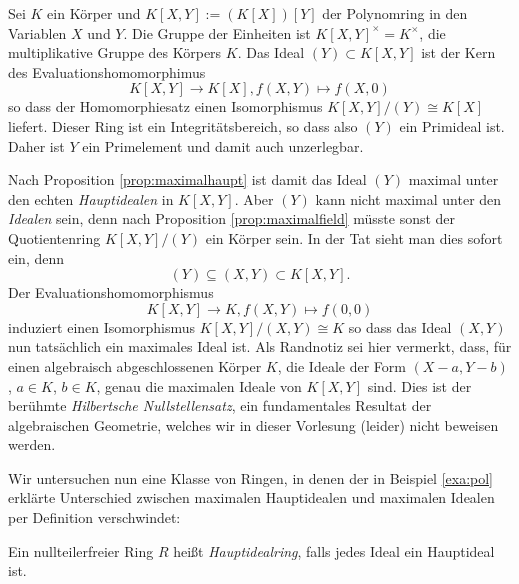 \documentclass{book}
\begin{document}
\begin{exa}
    \label{exa:pol}
    Sei $K$ ein Körper und $K[X,Y] := (K[X])[Y]$ der Polynomring in den Variablen $X$ und
    $Y$. Die Gruppe der Einheiten ist $K[X,Y]^{\times} = K^{\times}$, die
    multiplikative Gruppe des Körpers $K$. Das Ideal $(Y) \subset K[X,Y]$ ist
    der Kern des Evaluationshomomorphimus
    \[
        K[X,Y] \to K[X], f(X,Y) \mapsto f(X,0)
    \]
    so dass der Homomorphiesatz einen Isomorphismus $K[X,Y]/(Y) \cong K[X]$
    liefert. Dieser Ring ist ein Integritätsbereich, so dass also $(Y)$ ein
    Primideal ist. Daher ist $Y$ ein Primelement und damit auch unzerlegbar. 

    Nach Proposition \ref{prop:maximalhaupt} ist damit das Ideal $(Y)$ maximal
    unter den echten \emph{Hauptidealen} in $K[X,Y]$. Aber $(Y)$ kann nicht
    maximal unter den \emph{Idealen} sein, denn nach Proposition
    \ref{prop:maximalfield} müsste sonst der Quotientenring $K[X,Y]/(Y)$ ein
    Körper sein. 
%
    In der Tat sieht man dies sofort ein, denn
    \[
        (Y) \subseteq (X,Y) \subset K[X,Y].
    \]
    Der Evaluationshomomorphismus
    \[
        K[X,Y] \to K, f(X,Y) \mapsto f(0,0)
    \]
    induziert einen Isomorphismus $K[X,Y]/(X,Y) \cong K$ so dass das Ideal
    $(X,Y)$ nun tatsächlich ein maximales Ideal ist. 
%
    Als Randnotiz sei hier vermerkt, dass, für einen algebraisch
    abgeschlossenen Körper $K$, die Ideale der Form $(X-a,Y-b)$, $a \in K$, $b
    \in K$, genau die maximalen Ideale von $K[X,Y]$ sind. Dies ist der berühmte
    \emph{Hilbertsche Nullstellensatz}, ein fundamentales Resultat der
    algebraischen Geometrie, welches wir in dieser Vorlesung (leider) nicht
    beweisen werden.
\end{exa}

Wir untersuchen nun eine Klasse von Ringen, in denen der in Beispiel
\ref{exa:pol} erklärte Unterschied zwischen maximalen Hauptidealen und
maximalen Idealen per Definition verschwindet:

\begin{defi}
    \label{defi:hauptidealring}
    Ein nullteilerfreier Ring $R$ heißt \emph{Hauptidealring}, falls jedes Ideal ein Hauptideal ist. 
\end{defi}
    
\end{document}
